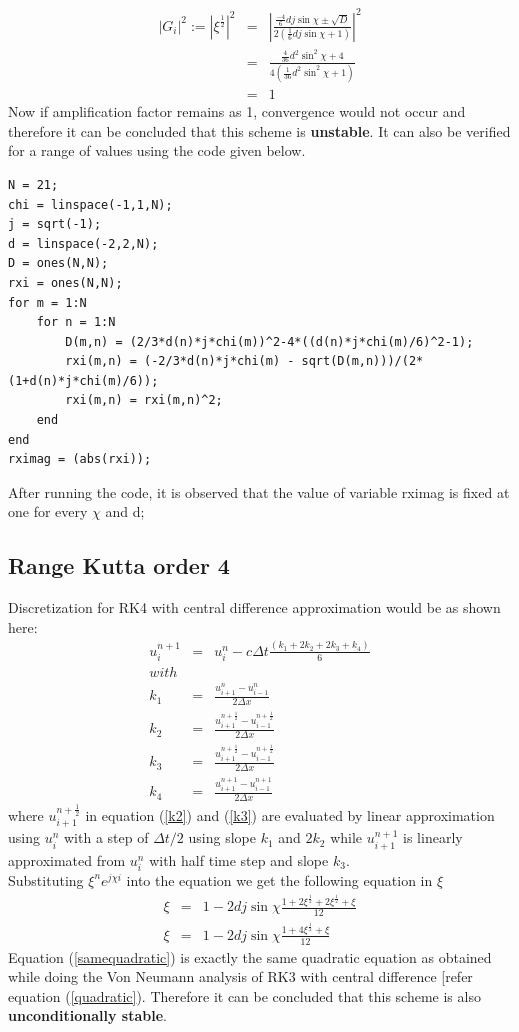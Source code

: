 \documentclass[a4paper,12pt]{report}
\begin{document}
\begin{eqnarray}
|G_i|^2 := |\xi^\frac{1}{2}|^2 &=& |\frac{\frac{-4}{6}dj\sin{\chi}\pm \sqrt{D}}{2(\frac{1}{6}dj\sin{\chi}+1)}|^2 \nonumber\\
&=& \frac{\frac{4}{36}d^2\sin^2{\chi}+4}{4(\frac{1}{36}d^2\sin^2{\chi}+1)}\label{root}\\
&=& 1
\end{eqnarray}
Now if amplification factor remains as 1, convergence would not occur and therefore it can be concluded that this scheme is \textbf{unstable}. It can also be verified for a range of values using the code given below.  
\begin{lstlisting}
N = 21;
chi = linspace(-1,1,N);
j = sqrt(-1);
d = linspace(-2,2,N);
D = ones(N,N);
rxi = ones(N,N);
for m = 1:N
    for n = 1:N
        D(m,n) = (2/3*d(n)*j*chi(m))^2-4*((d(n)*j*chi(m)/6)^2-1);
        rxi(m,n) = (-2/3*d(n)*j*chi(m) - sqrt(D(m,n)))/(2*(1+d(n)*j*chi(m)/6));
        rxi(m,n) = rxi(m,n)^2;
    end
end
rximag = (abs(rxi));
\end{lstlisting}
After running the code, it is observed that the value of variable rximag is fixed at one for every $\chi$ and d;
\subsection{Range Kutta order 4}
Discretization for RK4 with central difference approximation would be as shown here:
\begin{eqnarray}
u^{n+1}_{i} &=& u^{n}_{i} - c\Delta t \frac{(k_1+2k_2+2k_3+k_4)}{6}
\\with \nonumber\\
k_1 &=& \frac{u_{i+1}^{n} -u_{i-1}^{n}}{2\Delta x} \nonumber \\
k_2 &=& \frac{u_{i+1}^{n+\frac{1}{2}} -u_{i-1}^{n+\frac{1}{2}}}{2\Delta x} \label{k2}\\
k_3 &=& \frac{u_{i+1}^{n+\frac{1}{2}} -u_{i-1}^{n+\frac{1}{2}}}{2\Delta x} \label{k3}\\
k_4 &=& \frac{u_{i+1}^{n+1} -u_{i-1}^{n+1}}{2\Delta x} \nonumber
\end{eqnarray}
where $u_{i+1}^{n+\frac{1}{2}}$ in equation (\ref{k2}) and (\ref{k3}) are evaluated by linear approximation using $u^{n}_{i}$ with a step of $\Delta t/2$ using slope $k_1$ and $2k_2$ while $u_{i+1}^{n+1}$ is linearly approximated from $u^{n}_{i}$ with half time step and slope $k_3$. \\
Substituting $\xi^{n}e^{j\chi i}$ into the equation we get the following equation in $\xi$ \\
\begin{eqnarray}
\xi &=& 1-2dj\sin{\chi}\frac{1+2\xi^{\frac{1}{2}}+2\xi^{\frac{1}{2}}+\xi}{12} \nonumber \\
\xi &=& 1-2dj\sin{\chi}\frac{1+4\xi^{\frac{1}{2}}+\xi}{12} \label{samequadratic}
\end{eqnarray}
Equation (\ref{samequadratic}) is exactly the same quadratic equation as obtained while doing the Von Neumann analysis of RK3 with central difference [refer equation (\ref{quadratic}).
Therefore it can be concluded that this scheme is also \textbf{unconditionally stable}.
\newpage
\end{document}
